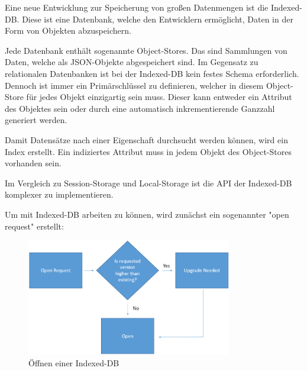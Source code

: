 \label{sec:indexeddb}

Eine neue Entwicklung zur Speicherung von großen Datenmengen ist die Indexed-DB. 
Diese ist eine Datenbank, welche den Entwicklern ermöglicht, Daten in der Form von Objekten abzuspeichern.

Jede Datenbank enthält sogenannte Object-Stores. Das sind Sammlungen von Daten, welche als JSON-Objekte abgespeichert sind. 
Im Gegensatz zu relationalen Datenbanken ist bei der Indexed-DB kein festes Schema erforderlich. 
Dennoch ist immer ein Primärschlüssel zu definieren, welcher in diesem Object-Store für jedes Objekt einzigartig sein muss.
Dieser kann entweder ein Attribut des Objektes sein oder durch eine automatisch inkrementierende Ganzzahl generiert werden. 

Damit Datensätze nach einer Eigenschaft durchsucht werden können, wird ein Index erstellt. 
Ein indiziertes Attribut muss in jedem Objekt des Object-Stores vorhanden sein.

Im Vergleich zu Session-Storage und Local-Storage ist die API der Indexed-DB komplexer zu implementieren.

Um mit Indexed-DB arbeiten zu können, wird zunächst ein sogenannter "open request" erstellt:


\begin{figure}[H]
    \centering
    \includegraphics[width=0.8\textwidth]{media/Webspeicher/openDb.png}
    \caption{Öffnen einer Indexed-DB \cite{fig:openDB}}
\end{figure}

